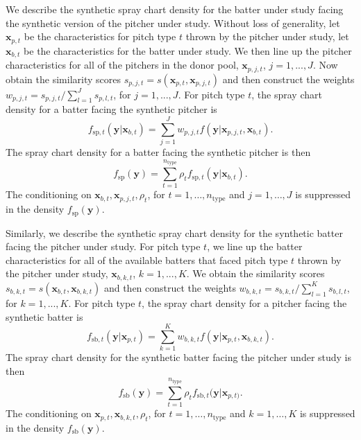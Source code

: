 \documentclass[12pt]{article}
\newcommand{\y}{\textbf{y}}
\newcommand{\x}{\textbf{x}}
\begin{document}
We describe the synthetic spray chart density for the batter under study facing the synthetic version of the pitcher under study. Without loss of generality, let $\x_{p,t}$ be the characteristics for pitch type $t$ thrown by the pitcher under study, let $\x_{b,t}$ be the characteristics for the batter under study. We then line up the pitcher characteristics for all of the pitchers in the donor pool, $\x_{p,j,t}$, $j = 1,...,J$. Now obtain the similarity scores $s_{p,j,t} = s(\x_{p,t},\x_{p,j,t})$ and then construct the weights $w_{p,j,t} = s_{p,j,t} / \sum_{l=1}^{J}s_{p,l,t}$, for $j = 1,...,J$. For pitch type $t$, the spray chart density for a batter facing the synthetic pitcher is 
\begin{equation} \label{synth-pitch-t}
  f_{\text{sp}, t}(\y|\x_{b,t}) = \sum_{j=1}^J w_{p,j,t}f(\y|\x_{p,j,t},\x_{b,t}).
\end{equation}
The spray chart density for a batter facing the synthetic pitcher is then
\begin{equation} \label{synth-pitch}
  f_{\text{sp}}(\y) = \sum_{t=1}^{n_{\text{type}}} \rho_t f_{\text{sp},t}(\y|\x_{b,t}).
\end{equation}
The conditioning on $\x_{b,t}, \x_{p,j,t}, \rho_t$, for $t = 1,\ldots,n_{\text{type}}$ and $j = 1,\ldots,J$ is suppressed in the density $f_{\text{sp}}(\y)$.
 
Similarly, we describe the synthetic spray chart density for the synthetic batter facing the pitcher under study. For pitch type $t$, we line up the batter characteristics for all of the available batters that faced pitch type $t$ thrown by the pitcher under study, $\x_{b,k,t}$, $k = 1,...,K$.  We obtain the similarity scores $s_{b,k,t} = s(\x_{b,t},\x_{b,k,t})$ and then construct the weights $w_{b,k,t} = s_{b,k,t} / \sum_{l=1}^{K}s_{b,l,t}$, for $k = 1,...,K$. For pitch type $t$, the spray chart density for a pitcher facing the synthetic batter is 
\begin{equation} \label{synth-bat-t}
  f_{\text{sb},t}(\y|\x_{p,t}) = \sum_{k=1}^K w_{b,k,t}f(\y|\x_{p,t},\x_{b,k,t}).
\end{equation}
The spray chart density for the synthetic batter facing the pitcher under study is then
\begin{equation} \label{synth-bat}
  f_{\text{sb}}(\y) = \sum_{t=1}^{n_{\text{type}}} \rho_t f_{\text{sb},t}(\y|\x_{p,t)}.
\end{equation}
The conditioning on $\x_{p,t}, \x_{b,k,t}, \rho_t$, for $t = 1,\ldots,n_{\text{type}}$ and $k = 1,\ldots,K$ is suppressed in the density $f_{\text{sb}}(\y)$.
\end{document}
